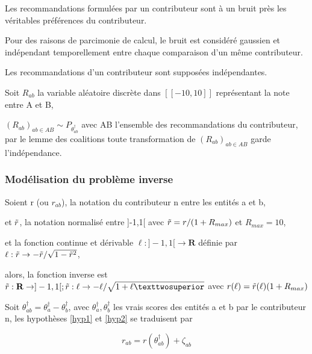 \begin{hypothesis}\label{hyp1}
Les recommandations formulées par un contributeur sont à un bruit près les véritables préférences du contributeur.
\end{hypothesis}
\begin{hypothesis}\label{hyp2}
Pour des raisons de parcimonie de calcul, le bruit est considéré gaussien et indépendant temporellement entre chaque comparaison d'un même contributeur.
\end{hypothesis}

\begin{hypothesis}\label{hyp3}

Les recommandations d'un contributeur sont supposées indépendantes.

Soit $R_{ab}$ la variable aléatoire discrète dans $[\![-10,10]\!]$ représentant la note entre A et B, 

$(R_{ab})_{ab \in AB} \sim P_{\theta^\dagger_{ab}}$ avec AB l'ensemble des recommandations du contributeur, par le lemme des coalitions toute transformation de  $(R_{ab})_{ab \in AB}$ garde l'indépendance.

\end{hypothesis}


\subsubsection{Modélisation du problème inverse}
Soient r (ou $r_{ab}$), la notation du contributeur n entre les entités a et b,

et $\Tilde{r}$, la notation normalisé entre ]-1,1[ avec $\Tilde{r} =r/(1+R_{max})$ et $R_{max}=10$,

et la fonction continue et dérivable $\ell : ]-1,1[ \rightarrow \mathbf{R}$ définie par $\ell : \Tilde{r} \rightarrow -\Tilde{r}/\sqrt{1-\Tilde{r}^2}$,

alors, la fonction inverse est $\Tilde{r} : \mathbf{R} \rightarrow  ]-1,1[ ; \Tilde{r} : \ell \rightarrow -\ell / \sqrt{1+\ell²} $ avec $r(\ell)= \Tilde{r}(\ell)(1+R_{max})$

Soit $\theta_{ab}^\dagger=\theta_a^\dagger-\theta_b^\dagger$, avec $\theta_a^\dagger, \theta_b^\dagger$ les vrais scores des entités a et b par le contributeur n, les hypothèses  \ref{hyp1} et \ref{hyp2} se traduisent par

\begin{equation}
r_{ab}=r(\theta_{ab}^\dagger)+\zeta_{ab}    
\end{equation}



